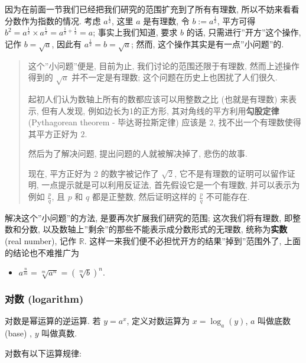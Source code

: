 因为在前面一节我们已经把我们研究的范围扩充到了所有有理数,
所以不妨来看看分数作为指数的情况. 考虑 \(a^{\frac{1}{2}}\), 这里 \(a\)
是有理数, 令 \(b:=a^{\frac{1}{2}}\), 平方可得
\(b^2=a^{\frac{1}{2}}\times a^{\frac{1}{2}}=a^{\frac{1}{2}+\frac{1}{2}}=a\);
事实上我们知道, 要求 \(b\) 的话, 只需进行''开方''这个操作, 记作
\(b=\sqrt{a}\), 因此有 \(a^{\frac{1}{2}}=b=\sqrt{a}\); 然而,
这个操作其实是有一点''小问题''的.

\begin{quote}
这个''小问题''便是, 目前为止, 我们讨论的范围还限于有理数,
然而上述操作得到的 \(\sqrt{a}\) 并不一定是有理数;
这个问题在历史上也困扰了人们很久.

起初人们认为数轴上所有的数都应该可以用整数之比 (也就是有理数) 来表示,
但有人发现, 例如边长为1的正方形, 其对角线的平方利用\textbf{勾股定律}
(Pythagorean theorem - 毕达哥拉斯定律) 应该是 \(2\),
找不出一个有理数使得其平方正好为 \(2\).

然后为了解决问题, 提出问题的人就被解决掉了, 悲伤的故事.

现在, 平方正好为 \(2\) 的数字被记作了 \(\sqrt{2}\),
它不是有理数的证明可以留作证明, 一点提示就是可以利用反证法,
首先假设它是一个有理数, 并可以表示为例如 \(\frac{p}{q}\), 且 \(p\) 和
\(q\) 都是正整数, 然后证明这样的 \(\frac{p}{q}\) 不可能存在.
\end{quote}

解决这个''小问题''的方法, 是要再次扩展我们研究的范围; 这次我们将有理数,
即整数和分数, 以及数轴上''剩余''的那些不能表示成分数形式的无理数,
统称为\textbf{实数} (real number), 记作 \(\mathbb{R}\).
这样一来我们便不必担忧开方的结果''掉到''范围外了, 上面的结论也不难推广为

\begin{itemize}
\tightlist
\item
  \(a^{\frac{n}{m}}=\sqrt[m]{a^n}=(\sqrt[m]{b})^n\).
\end{itemize}

\hypertarget{ux5bf9ux6570-logarithm}{%
\subsubsection{对数 (logarithm)}\label{ux5bf9ux6570-logarithm}}

对数是幂运算的逆运算. 若 \(y=a^x\), 定义对数运算为 \(x=\log_a(y)\),
\(a\) 叫做底数 (base) , \(y\) 叫做真数.

对数有以下运算规律:

